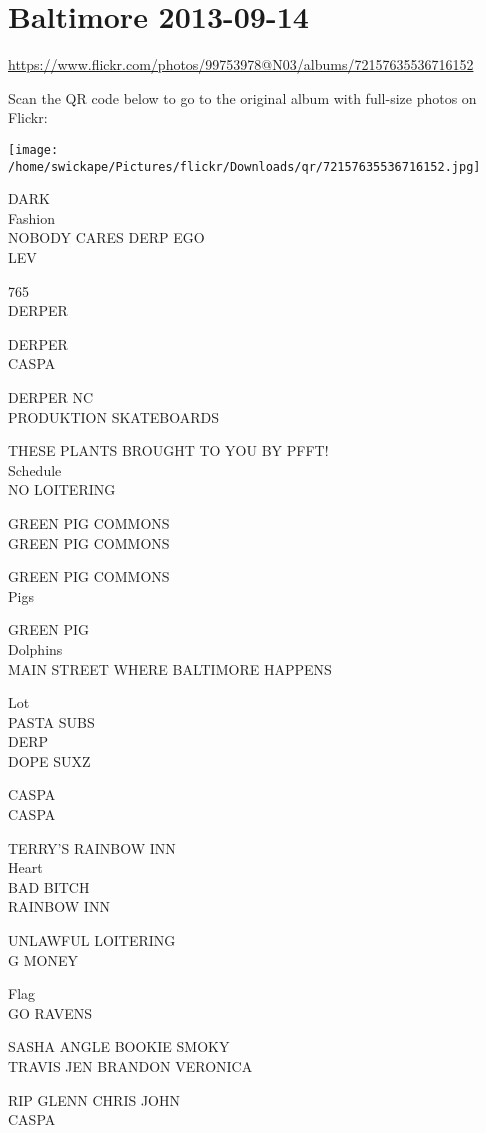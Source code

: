 \documentclass[10pt,letterpaper]{article}
\begin{document}
\section*{Baltimore 2013-09-14}

\url{https://www.flickr.com/photos/99753978@N03/albums/72157635536716152}

Scan the QR code below to go to the original album with full-size photos on Flickr:

\texttt{[image: /home/swickape/Pictures/flickr/Downloads/qr/72157635536716152.jpg]}
\pagebreak

DARK\\
Fashion\\
NOBODY CARES DERP EGO\\
LEV

765\\
DERPER

DERPER\\
CASPA

DERPER NC\\
PRODUKTION SKATEBOARDS

THESE PLANTS BROUGHT TO YOU BY PFFT!\\
Schedule\\
NO LOITERING

GREEN PIG COMMONS\\
GREEN PIG COMMONS

GREEN PIG COMMONS\\
Pigs

GREEN PIG\\
Dolphins\\
MAIN STREET WHERE BALTIMORE HAPPENS

Lot\\
PASTA SUBS\\
DERP\\
DOPE SUXZ

CASPA\\
CASPA

TERRY'S RAINBOW INN\\
Heart\\
BAD BITCH\\
RAINBOW INN

UNLAWFUL LOITERING\\
G MONEY

Flag\\
GO RAVENS

SASHA ANGLE BOOKIE SMOKY\\
TRAVIS JEN BRANDON VERONICA

RIP GLENN CHRIS JOHN\\
CASPA
\end{document}
